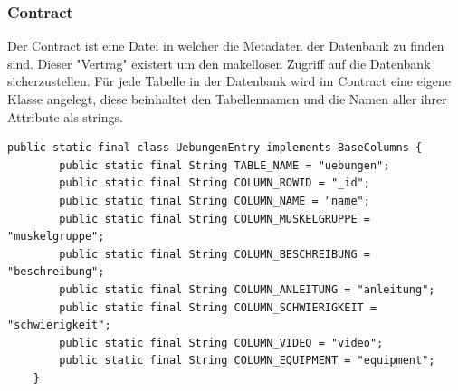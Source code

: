\documentclass[FIPLY_base.tex]{subfiles}
\begin{document}
\subsubsection{Contract}
Der Contract ist eine Datei in welcher die Metadaten der Datenbank zu finden sind.
Dieser "Vertrag" existert um den makellosen Zugriff auf die Datenbank sicherzustellen.
Für jede Tabelle in der Datenbank wird im Contract eine eigene Klasse angelegt, diese beinhaltet den Tabellennamen und die Namen aller ihrer Attribute als strings.
\begin{lstlisting}[caption={Eine Contract Klasse, mit allen Metadaten.},label=DescriptiveLabel]
    public static final class UebungenEntry implements BaseColumns {
        public static final String TABLE_NAME = "uebungen";
        public static final String COLUMN_ROWID = "_id";
        public static final String COLUMN_NAME = "name";
        public static final String COLUMN_MUSKELGRUPPE = "muskelgruppe";
        public static final String COLUMN_BESCHREIBUNG = "beschreibung";
        public static final String COLUMN_ANLEITUNG = "anleitung";
        public static final String COLUMN_SCHWIERIGKEIT = "schwierigkeit";
        public static final String COLUMN_VIDEO = "video";
        public static final String COLUMN_EQUIPMENT = "equipment";
    }
\end{lstlisting}
\end{document}
